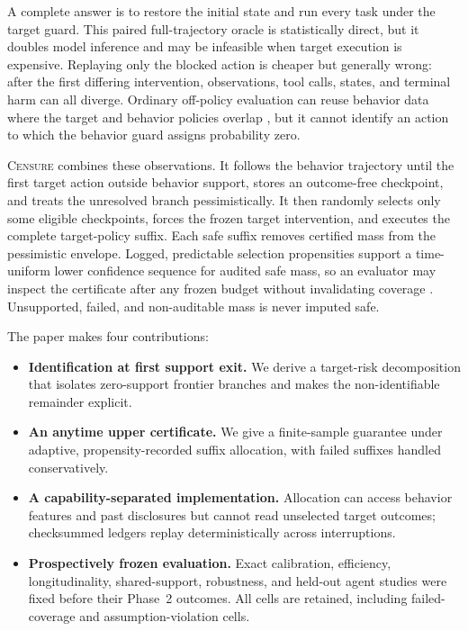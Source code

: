 \documentclass{article}
\newcommand{\method}{\textsc{Censure}}
\begin{document}
A complete answer is to restore the initial state and run every task under the target guard. This
paired full-trajectory oracle is statistically direct, but it doubles model inference and may be
infeasible when target execution is expensive. Replaying only the blocked action is cheaper but
generally wrong: after the first differing intervention, observations, tool calls, states, and
terminal harm can all diverge. Ordinary off-policy evaluation can reuse behavior data where the
target and behavior policies overlap \citep{dudik2011doubly,jiang2016doubly}, but it cannot identify
an action to which the behavior guard assigns probability zero.

\method{} combines these observations. It follows the behavior trajectory until the first target
action outside behavior support, stores an outcome-free checkpoint, and treats the unresolved
branch pessimistically. It then randomly selects only some eligible checkpoints, forces the frozen
target intervention, and executes the complete target-policy suffix. Each safe suffix removes
certified mass from the pessimistic envelope. Logged, predictable selection propensities support a
time-uniform lower confidence sequence for audited safe mass, so an evaluator may inspect the
certificate after any frozen budget without invalidating coverage
\citep{howard2021confidence}. Unsupported, failed, and non-auditable mass is never imputed safe.

The paper makes four contributions:
\begin{itemize}
  \item \textbf{Identification at first support exit.} We derive a target-risk decomposition that
  isolates zero-support frontier branches and makes the non-identifiable remainder explicit.
  \item \textbf{An anytime upper certificate.} We give a finite-sample guarantee under adaptive,
  propensity-recorded suffix allocation, with failed suffixes handled conservatively.
  \item \textbf{A capability-separated implementation.} Allocation can access behavior features
  and past disclosures but cannot read unselected target outcomes; checksummed ledgers replay
  deterministically across interruptions.
  \item \textbf{Prospectively frozen evaluation.} Exact calibration, efficiency, longitudinality,
  shared-support, robustness, and held-out agent studies were fixed before their Phase~2 outcomes.
  All cells are retained, including failed-coverage and assumption-violation cells.
\end{itemize}
\end{document}
